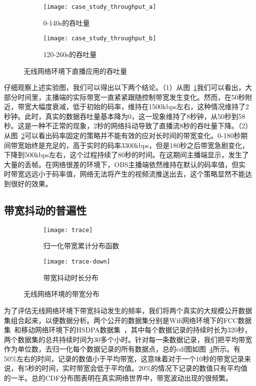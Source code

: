 \begin{figure}[h]
  \centering%
  \begin{subfigure}{0.49\textwidth}
    \texttt{[image: case\_study\_throughput\_a]}
    \caption{0-140s的吞吐量}
    \label{fig:case_study_a}
  \end{subfigure}%
  \hfill
  \begin{subfigure}{0.49\textwidth}
    \texttt{[image: case\_study\_throughput\_b]}
    \caption{120-260s的吞吐量}
    \label{fig:case_study_b}
  \end{subfigure}
  \vspace{0.1in}
  \caption{无线网络环境下直播应用的吞吐量}
  \label{fig:case_study}
\end{figure}

仔细观察上述实验图，我们可以得出以下两个结论。（1）从图~\ref{fig:case_study_a}我们可以看出，大部分时间里，主播端的实际带宽一直紧紧跟随控制带宽发生变化。然而，在50秒附近，带宽大幅度衰减，低于初始的码率，维持在1500kbps左右，这种情况维持了2秒钟。此时，真实的数据吞吐量基本降为0，这一现象维持了8秒钟，从50秒到58秒。这是一种不正常的现象，2秒的网络抖动导致了直播流8秒的吞吐量下降。（2）从图~\ref{fig:case_study_b}可以看出码率固定的策略并不能有效的应对长时间的带宽变化。0-180秒期间带宽始终是充足的，高于实时的码率3300kbps，但是180秒之后带宽急剧变化，下降到500kbps左右，这个过程持续了80秒的时间。在这期间主播端显示，发生了大量的丢帧。在网络很差的环境下，OBS主播端依然维持在默认的码率值，但实时带宽远远小于码率值，网络无法将产生的视频流推送出去，这个策略显然不能达到很好的效果。

\subsection{带宽抖动的普遍性}
\begin{figure}[h]
  \centering%
  \begin{subfigure}{0.49\textwidth}
    \texttt{[image: trace]}
    \caption{归一化带宽累计分布函数}
    \label{fig:trace}
  \end{subfigure}%
  \hfill
  \begin{subfigure}{0.49\textwidth}
    \texttt{[image: trace-down]}
    \caption{带宽抖动时长分布}
    \label{fig:trace_down}
  \end{subfigure}
  \vspace{0.1in}
  \caption{无线网络环境的带宽分布}
  \label{fig:trace_distribution}
\end{figure}

为了评估无线网络环境下带宽抖动发生的频率，我们将两个真实的大规模公开数据集组合起来，以便数据分析。两个公开的数据集分别是Wifi网络环境下的FCC数据集~\cite{FCC}和移动网络环境下的HSDPA数据集~\cite{riiser2013commute}，其中每个数据记录的持续时长为320秒，两个数据集的总共持续时间为30多个小时。针对每一条数据记录，我们把平均带宽作为单位数，去归一化每个数据记录的所有数据点，总的cdf图如图~\ref{fig:trace}所示。有50\%左右的时间，记录的数值小于平均带宽，这意味着对于一个10秒的带宽记录来说，有5秒的时间，实时带宽会低于平均值。20\%的情况下记录的数值只有平均值的一半。总的CDF分布图表明在真实网络世界中，带宽波动出现的很频繁。

